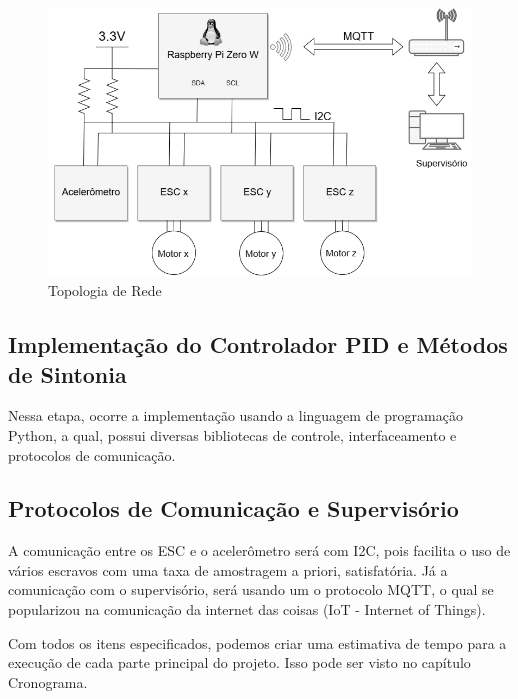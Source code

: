 \begin{figure}[H]
  \caption{Topologia de Rede}
  \begin{center}
      \includegraphics[scale=.75]{img/comunicacao_projeto}
  \end{center}
  \label{fig:comunicacao_projeto}
\end{figure}

\subsection{Implementação do Controlador PID e Métodos de Sintonia}

Nessa etapa, ocorre a implementação usando a linguagem de programação Python, a qual, possui diversas bibliotecas de controle, interfaceamento e protocolos de comunicação. 

\subsection{Protocolos de Comunicação e Supervisório}

A comunicação entre os ESC e o acelerômetro será com I2C, pois facilita o uso de vários escravos com uma taxa de amostragem a priori, satisfatória. Já a comunicação com o supervisório, será usando um  o protocolo MQTT, o qual se popularizou na comunicação da internet das coisas (IoT - Internet of Things).

Com todos os itens especificados, podemos criar uma estimativa de tempo para a execução de cada parte principal do projeto. Isso pode ser visto no capítulo Cronograma.
